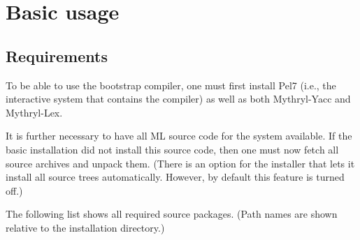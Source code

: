 
\section{Basic usage}

\subsection{Requirements}

To be able to use the bootstrap compiler, one must first install
Pel7 (i.e., the interactive system that contains the compiler) as
well as both Mythryl-Yacc and Mythryl-Lex.

It is further necessary to have all ML source code for the system
available.  If the basic installation did not install this source
code, then one must now fetch all source archives and unpack them.
(There is an option for the installer that lets it install all
source trees automatically.  However, by default this feature is turned
off.)

The following list shows all required source packages.  (Path names
are shown relative to the installation directory.)

